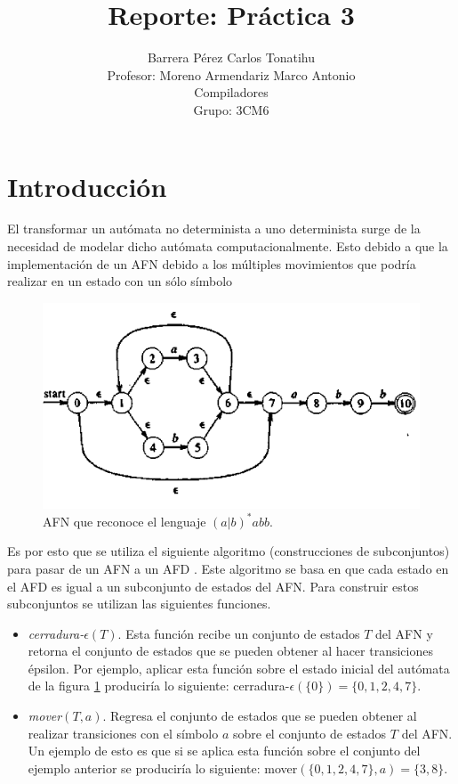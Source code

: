 \documentclass[titlepage]{article}
\title{Reporte: Práctica 3}
\author{Barrera Pérez Carlos Tonatihu \\ Profesor: Moreno Armendariz Marco Antonio \\ Compiladores \\ Grupo: 3CM6 }
\begin{document}
\maketitle
\tableofcontents
\newpage
\section{Introducción}
El transformar un autómata no determinista a uno determinista surge de la necesidad de modelar dicho autómata computacionalmente. Esto debido a que la implementación de un AFN debido a los múltiples movimientos que podría realizar en un estado con un sólo símbolo
\begin{figure}[H]
        \begin{center}
        \includegraphics[width=12cm]{AFN.png}
        \caption{AFN que reconoce el lenguaje $(a|b)^{*}abb$.}
        \label{fig:AFN}
        \end{center}
    \end{figure}
Es por esto que se utiliza el siguiente algoritmo (construcciones de subconjuntos) para pasar de un AFN a un AFD \cite{compis}. Este algoritmo se basa en que cada estado en el AFD es igual a un subconjunto de estados del AFN. Para construir estos subconjuntos se utilizan las siguientes funciones.
\begin{itemize}
	\item \emph{cerradura-$\epsilon(T)$}. Esta función recibe un conjunto de estados $T$ del AFN y retorna el conjunto de estados que se pueden obtener al hacer transiciones épsilon. Por ejemplo, aplicar esta función sobre el estado inicial del autómata de la figura \ref{fig:AFN} produciría lo siguiente: cerradura-$\epsilon(\{0\}) = \{0, 1, 2, 4, 7\}$.
	
	\item \emph{mover$(T, a)$}. Regresa el conjunto de estados que se pueden obtener al realizar transiciones con el símbolo $a$ sobre el conjunto de estados $T$ del AFN. Un ejemplo de esto es que si se aplica esta función sobre el conjunto del ejemplo anterior se produciría lo siguiente: mover$(\{0, 1, 2, 4, 7\}, a) = \{3, 8\}$.
\end{itemize}
\end{document}
